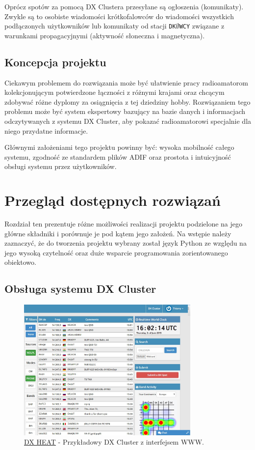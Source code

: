 \documentclass[]{mgr}
\begin{document}
        Oprócz spotów za pomocą DX Clustera przesyłane są ogłoszenia (komunikaty). Zwykle są to osobiste wiadomości krótkofalowców do wiadomości wszystkich podłączonych użytkowników lub komunikaty od stacji \texttt{DK$\emptyset$WCY} związane z warunkami propagacyjnymi (aktywność słoneczna i magnetyczna).

        \section{Koncepcja projektu}
        \label{sec:problem_description}
        Ciekawym problemem do rozwiązania może być ułatwienie pracy radioamatorom kolekcjonującym potwierdzone łączności z różnymi krajami oraz chcącym zdobywać różne dyplomy za osiągnięcia z tej dziedziny hobby. Rozwiązaniem tego problemu może być system ekspertowy bazujący na bazie danych i informacjach odczytywanych z systemu DX Cluster, aby pokazać radioamatorowi specjalnie dla niego przydatne informacje.

        Głównymi założeniami tego projektu powinny być: wysoka mobilność całego systemu, zgodność ze standardem plików ADIF oraz prostota i intuicyjność obsługi systemu przez użytkowników.

    \chapter{Przegląd dostępnych rozwiązań}
    \label{sec:existing_possibilities}
    Rozdział ten prezentuje różne możliwości realizacji projektu podzielone na jego główne składniki i porównuje je pod kątem jego założeń. Na wstępie należy zaznaczyć, że do tworzenia projektu wybrany został język Python ze względu na jego wysoką czytelność oraz duże wsparcie programowania zorientowanego obiektowo.

        \section{Obsługa systemu DX Cluster}
        \begin{figure}[hb]
            \centering
            \includegraphics[width=0.8\textwidth]{dxheat}
            \caption{\underline{DX HEAT} - Przykładowy DX Cluster z interfejsem WWW.}
            \label{fig:dxheat}
        \end{figure}
\end{document}
